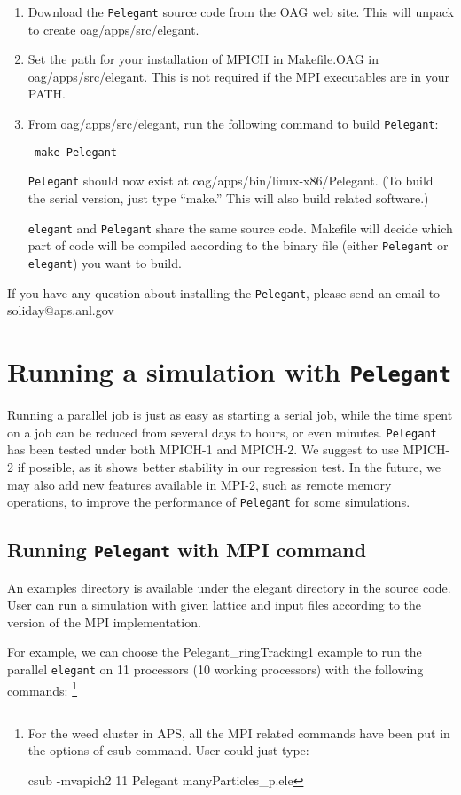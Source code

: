 \documentclass[11pt]{article}
\begin{document}
\begin{enumerate}
\item Download the {\tt Pelegant} source code from the OAG web site. This will unpack to create oag/apps/src/elegant. 
\item Set the path for your installation of MPICH in Makefile.OAG in oag/apps/src/elegant. This is not required if the MPI executables are in your PATH.
\item From oag/apps/src/elegant, run the following command to build {\tt Pelegant}:
\begin{verbatim}
 make Pelegant
\end{verbatim}
{\tt Pelegant} should now exist at oag/apps/bin/linux-x86/Pelegant.  (To build the serial version, just 
type ``make.''  This will also build related software.)

{\tt elegant} and {\tt Pelegant} share the same source code.
Makefile will decide which part of code will be compiled according to the binary file 
(either {\tt Pelegant} or {\tt elegant}) you want to build.
\end{enumerate}
  
{\noindent}If you have any question about installing the {\tt Pelegant}, please send an email to soliday@aps.anl.gov

\section{Running a simulation with {\tt Pelegant}}

Running a parallel job is just as easy as starting a serial job, while
the time spent on a job can be reduced from several days to hours, or
even minutes.  {\tt Pelegant} has been tested under both MPICH-1 and
MPICH-2. We suggest to use MPICH-2 if possible, as it shows better
stability in our regression test. In the future, we may also add new
features available in MPI-2, such as remote memory
operations, to improve the performance of {\tt Pelegant} for some
simulations.

\subsection{Running {\tt Pelegant} with MPI command}

An examples directory is available under the elegant directory in the source code. User can run a simulation with given
lattice and input files according to the version of the MPI implementation.

 For example, we can choose the Pelegant\_ringTracking1 example to run the parallel 
{\tt elegant} on 11 processors (10 working processors) with the following commands:
\footnote {For the weed cluster in APS,  all the MPI related commands 
have been put in the options of csub command. User could just type: 

    csub -mvapich2 11 Pelegant manyParticles\_p.ele 
 }
\end{document}
